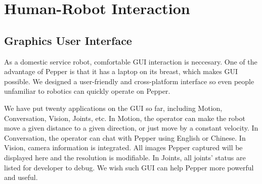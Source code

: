 \section{Human-Robot Interaction}
\label{sec:hri}

\subsection{Graphics User Interface}
\label{subsec:gui}
As a domestic service robot, comfortable GUI interaction is neccesary. 
One of the advantage of Pepper is that it has a laptop on its breast, which makes GUI possible. 
We designed a user-friendly and cross-platform interface so even people unfamiliar to robotics can quickly operate on Pepper. 

We have put twenty applications on the GUI so far, including Motion, Conversation, Vision, Joints, etc. 
In Motion, the operator can make the robot move a given distance to a given direction, or just move by a constant velocity.
In Conversation, the operator can chat with Pepper using English or Chinese.
In Vision, camera information is integrated. All images Pepper captured will be displayed here and the resolution is modifiable.
In Joints, all joints' status are listed for developer to debug.
We wish such GUI can help Pepper more powerful and useful.

